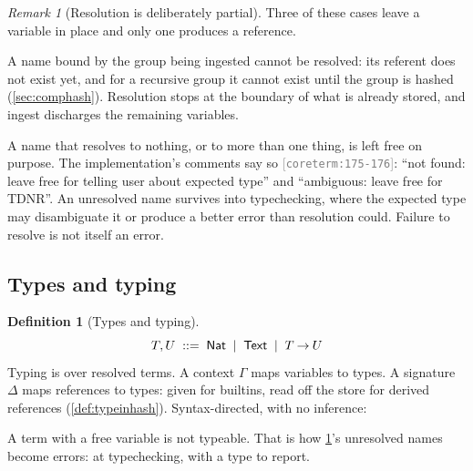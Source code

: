 \documentclass[11pt]{article}
\theoremstyle{definition}
\newtheorem{definition}{Definition}[section]
\theoremstyle{plain}
\theoremstyle{remark}
\newtheorem{remark}{Remark}[section]
\newcommand{\src}[1]{{\footnotesize\textcolor{gray}{[\texttt{#1}]}}}
\begin{document}
\begin{remark}[Resolution is deliberately partial]\label{rem:staging}
Three of these cases leave a variable in place and only one produces a reference.

A name bound by the group being ingested cannot be resolved: its referent does not exist yet, and for
a recursive group it cannot exist until the group is hashed (\cref{sec:comphash}). Resolution stops at
the boundary of what is already stored, and ingest discharges the remaining variables.

A name that resolves to nothing, or to more than one thing, is left free on purpose. The
implementation's comments say so \src{coreterm:175-176}: ``not found: leave free for telling user
about expected type'' and ``ambiguous: leave free for TDNR''. An unresolved name survives into
typechecking, where the expected type may disambiguate it or produce a better error than resolution
could. Failure to resolve is not itself an error.
\end{remark}

\subsection{Types and typing}

\begin{definition}[Types and typing]\label{def:utyping}
\[
  T,U \;::=\; \mathsf{Nat} \;\mid\; \mathsf{Text} \;\mid\; T \mathbin{\to} U
\]
Typing is over resolved terms. A context $\Gamma$ maps variables to types. A signature $\Delta$ maps
references to types: given for builtins, read off the store for derived references
(\cref{def:typeinhash}). Syntax-directed, with no inference:
A term with a free variable is not typeable. That is how \cref{rem:staging}'s unresolved names become
errors: at typechecking, with a type to report.
\end{definition}
\end{document}
